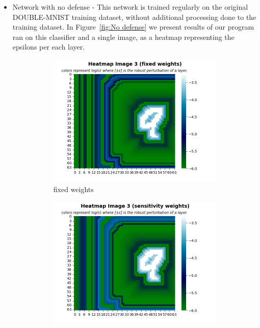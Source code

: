 \documentclass[11pt]{article}
\begin{document}
\begin{itemize}
    \item Network with no defense - This network is trained regularly on the original DOUBLE-MNIST training dataset, without additional processing done to the training dataset.
    In Figure~\ref{fig:No defense} we present results of our program ran on this classifier and a single image, as a heatmap representing the epsilons per each layer.
    \begin{figure}
         \centering
         \begin{subfigure}[b]{0.4\textwidth}
             \centering
             \includegraphics[width=\textwidth]{no_defense_fixed_weights.png}
             \caption{fixed weights}
             \label{sub-fig:No defense FW}
         \end{subfigure}
         \hfill
         \begin{subfigure}[b]{0.4\textwidth}
             \centering
             \includegraphics[width=\textwidth]{no_defense_sensitivity_weights.png}

\end{subfigure}
\end{figure}
\end{itemize}
\end{document}
